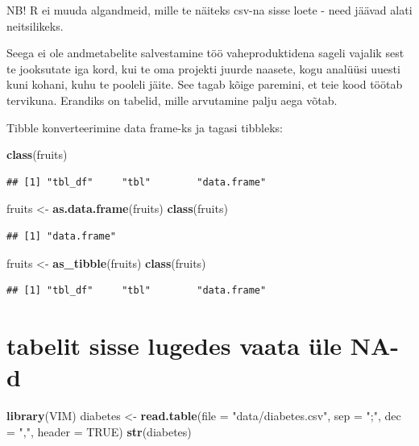 \documentclass[]{book}
\newenvironment{Shaded}{\begin{snugshade}}{\end{snugshade}}
\newcommand{\KeywordTok}[1]{\textcolor[rgb]{0.13,0.29,0.53}{\textbf{#1}}}
\newcommand{\DataTypeTok}[1]{\textcolor[rgb]{0.13,0.29,0.53}{#1}}
\newcommand{\StringTok}[1]{\textcolor[rgb]{0.31,0.60,0.02}{#1}}
\newcommand{\OtherTok}[1]{\textcolor[rgb]{0.56,0.35,0.01}{#1}}
\newcommand{\NormalTok}[1]{#1}
\begin{document}
NB! R ei muuda algandmeid, mille te näiteks csv-na sisse loete - need
jäävad alati neitsilikeks.

Seega ei ole andmetabelite salvestamine töö vaheproduktidena sageli
vajalik sest te jooksutate iga kord, kui te oma projekti juurde naasete,
kogu analüüsi uuesti kuni kohani, kuhu te pooleli jäite. See tagab kõige
paremini, et teie kood töötab tervikuna. Erandiks on tabelid, mille
arvutamine palju aega võtab.

Tibble konverteerimine data frame-ks ja tagasi tibbleks:

\begin{Shaded}
\begin{Highlighting}[]
\KeywordTok{class}\NormalTok{(fruits)}
\end{Highlighting}
\end{Shaded}

\begin{verbatim}
## [1] "tbl_df"     "tbl"        "data.frame"
\end{verbatim}

\begin{Shaded}
\begin{Highlighting}[]
\NormalTok{fruits <-}\StringTok{ }\KeywordTok{as.data.frame}\NormalTok{(fruits)}
\KeywordTok{class}\NormalTok{(fruits)}
\end{Highlighting}
\end{Shaded}

\begin{verbatim}
## [1] "data.frame"
\end{verbatim}

\begin{Shaded}
\begin{Highlighting}[]
\NormalTok{fruits <-}\StringTok{ }\KeywordTok{as_tibble}\NormalTok{(fruits)}
\KeywordTok{class}\NormalTok{(fruits)}
\end{Highlighting}
\end{Shaded}

\begin{verbatim}
## [1] "tbl_df"     "tbl"        "data.frame"
\end{verbatim}

\section{tabelit sisse lugedes vaata üle
NA-d}\label{tabelit-sisse-lugedes-vaata-ule-na-d}

\begin{Shaded}
\begin{Highlighting}[]
\KeywordTok{library}\NormalTok{(VIM) }
\NormalTok{diabetes <-}\StringTok{ }\KeywordTok{read.table}\NormalTok{(}\DataTypeTok{file =} \StringTok{"data/diabetes.csv"}\NormalTok{, }\DataTypeTok{sep =} \StringTok{";"}\NormalTok{, }\DataTypeTok{dec =} \StringTok{","}\NormalTok{, }\DataTypeTok{header =} \OtherTok{TRUE}\NormalTok{)}
\KeywordTok{str}\NormalTok{(diabetes)}
\end{Highlighting}
\end{Shaded}
\end{document}
